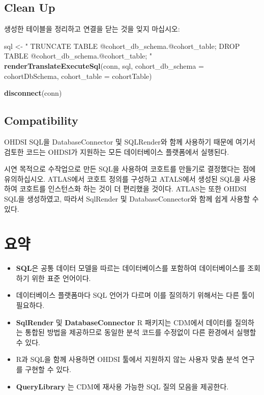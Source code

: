 \documentclass[11pt]{book}
\newenvironment{Shaded}{\begin{snugshade}}{\end{snugshade}}
\newcommand{\KeywordTok}[1]{\textcolor[rgb]{0.13,0.29,0.53}{\textbf{#1}}}
\newcommand{\DataTypeTok}[1]{\textcolor[rgb]{0.13,0.29,0.53}{#1}}
\newcommand{\StringTok}[1]{\textcolor[rgb]{0.31,0.60,0.02}{#1}}
\newcommand{\NormalTok}[1]{#1}
\theoremstyle{definition}
\theoremstyle{definition}
\theoremstyle{definition}
\theoremstyle{remark}
\let\BeginKnitrBlock\begin \let\EndKnitrBlock\end
\begin{document}
\subsection{Clean Up}\label{clean-up}

생성한 테이블을 정리하고 연결을 닫는 것을 잊지 마십시오:

\begin{Shaded}
\begin{Highlighting}[]
\NormalTok{sql <-}\StringTok{ "}
\StringTok{TRUNCATE TABLE @cohort_db_schema.@cohort_table;}
\StringTok{DROP TABLE @cohort_db_schema.@cohort_table;}
\StringTok{"}
\KeywordTok{renderTranslateExecuteSql}\NormalTok{(conn, sql,}
                          \DataTypeTok{cohort_db_schema =}\NormalTok{ cohortDbSchema,}
                          \DataTypeTok{cohort_table =}\NormalTok{ cohortTable)}

\KeywordTok{disconnect}\NormalTok{(conn)}
\end{Highlighting}
\end{Shaded}

\subsection{Compatibility}\label{compatibility}

OHDSI SQL을 DatabaseConnector 및 SQLRender와 함께 사용하기 때문에 여기서
검토한 코드는 OHDSI가 지원하는 모든 데이터베이스 플랫폼에서 실행된다.

시연 목적으로 수작업으로 만든 SQL을 사용하여 코호트를 만들기로
결정했다는 점에 유의하십시오. ATLAS에서 코호트 정의를 구성하고 ATALS에서
생성된 SQL을 사용하여 코호트를 인스턴스화 하는 것이 더 편리했을 것이다.
ATLAS는 또한 OHDSI SQL을 생성하였고, 따라서 SqlRender 및
DatabaseConnector와 함께 쉽게 사용할 수 있다.

\section{요약}\label{-7}

\BeginKnitrBlock{rmdsummary}
\begin{itemize}
\item
  \textbf{SQL}은 공통 데이터 모델을 따르는 데이터베이스를 포함하여
  데이터베이스를 조회하기 위한 표준 언어이다.
\item
  데이터베이스 플랫폼마다 SQL 언어가 다르며 이를 질의하기 위해서는 다른
  툴이 필요하다.
\item
  \textbf{SqlRender} 및 \textbf{DatabaseConnector} R 패키지는 CDM에서
  데이터를 질의하는 통합된 방법을 제공하므로 동일한 분석 코드를 수정없이
  다른 환경에서 실행할 수 있다.
\item
  R과 SQL을 함께 사용하면 OHDSI 툴에서 지원하지 않는 사용자 맞춤 분석
  연구를 구현할 수 있다.
\item
  \textbf{QueryLibrary} 는 CDM에 재사용 가능한 SQL 질의 모음을 제공한다.
\end{itemize}
\EndKnitrBlock{rmdsummary}
\end{document}
